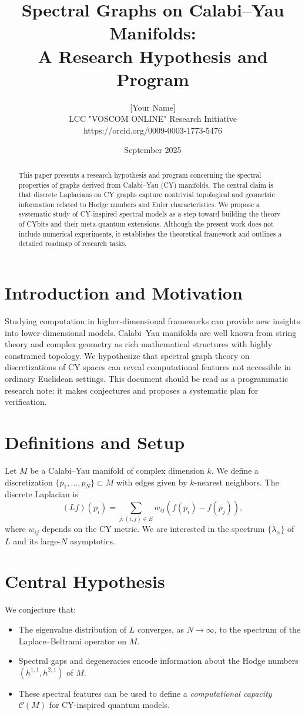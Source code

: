 \documentclass[12pt,a4paper]{article}
\title{Spectral Graphs on Calabi--Yau Manifolds: \\
A Research Hypothesis and Program}
\author{[Your Name] \\ LCC "VOSCOM ONLINE" Research Initiative \\ https://orcid.org/0009-0003-1773-5476}
\date{September 2025}
\begin{document}
\maketitle

\begin{abstract}
This paper presents a research hypothesis and program concerning 
the spectral properties of graphs derived from Calabi--Yau (CY) manifolds. 
The central claim is that discrete Laplacians on CY graphs capture 
nontrivial topological and geometric information 
related to Hodge numbers and Euler characteristics. 
We propose a systematic study of CY-inspired spectral models 
as a step toward building the theory of CYbits and 
their meta-quantum extensions. 
Although the present work does not include numerical experiments, 
it establishes the theoretical framework and outlines 
a detailed roadmap of research tasks.
\end{abstract}

\section{Introduction and Motivation}
Studying computation in higher-dimensional frameworks 
can provide new insights into lower-dimensional models. 
Calabi--Yau manifolds are well known from string theory 
and complex geometry as rich mathematical structures 
with highly constrained topology. 
We hypothesize that spectral graph theory on discretizations of CY spaces 
can reveal computational features not accessible in ordinary Euclidean settings.
This document should be read as a programmatic research note: 
it makes conjectures and proposes a systematic plan for verification.

\section{Definitions and Setup}
Let $M$ be a Calabi--Yau manifold of complex dimension $k$.  
We define a discretization $\{p_1,\dots,p_N\}\subset M$ 
with edges given by $k$-nearest neighbors.  
The discrete Laplacian is
\[
(Lf)(p_i) = \sum_{j:(i,j)\in E} w_{ij}(f(p_i)-f(p_j)),
\]
where $w_{ij}$ depends on the CY metric.
We are interested in the spectrum $\{\lambda_\alpha\}$ of $L$ 
and its large-$N$ asymptotics.

\section{Central Hypothesis}
We conjecture that:
\begin{itemize}
\item The eigenvalue distribution of $L$ converges, as $N\to\infty$, 
to the spectrum of the Laplace--Beltrami operator on $M$.  
\item Spectral gaps and degeneracies encode information about 
the Hodge numbers $(h^{1,1}, h^{2,1})$ of $M$.  
\item These spectral features can be used to define 
a \emph{computational capacity} $\mathcal{C}(M)$ 
for CY-inspired quantum models.  
\end{itemize}
\end{document}
